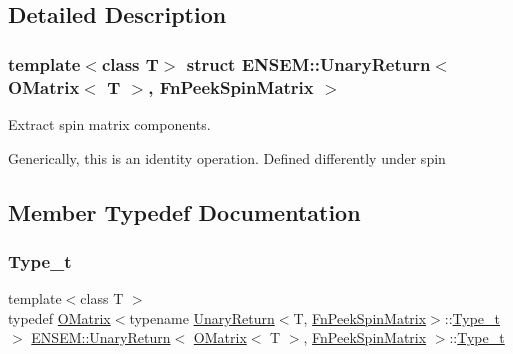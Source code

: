 \subsection{Detailed Description}
\subsubsection*{template$<$class T$>$\newline
struct E\+N\+S\+E\+M\+::\+Unary\+Return$<$ O\+Matrix$<$ T $>$, Fn\+Peek\+Spin\+Matrix $>$}

Extract spin matrix components. 

Generically, this is an identity operation. Defined differently under spin 

\subsection{Member Typedef Documentation}
\mbox{\label{structENSEM_1_1UnaryReturn_3_01OMatrix_3_01T_01_4_00_01FnPeekSpinMatrix_01_4_a9a23ee99cd498ef33180f667eae28655}} 
\subsubsection{\texorpdfstring{Type\_t}{Type\_t}\hspace{0.1cm}{\footnotesize\ttfamily [1/3]}}
{\footnotesize\ttfamily template$<$class T $>$ \\
typedef \mbox{\hyperlink{classENSEM_1_1OMatrix}{O\+Matrix}}$<$typename \mbox{\hyperlink{structENSEM_1_1UnaryReturn}{Unary\+Return}}$<$T, \mbox{\hyperlink{structENSEM_1_1FnPeekSpinMatrix}{Fn\+Peek\+Spin\+Matrix}}$>$\+::\mbox{\hyperlink{structENSEM_1_1UnaryReturn_3_01OMatrix_3_01T_01_4_00_01FnPeekSpinMatrix_01_4_a9a23ee99cd498ef33180f667eae28655}{Type\+\_\+t}}$>$ \mbox{\hyperlink{structENSEM_1_1UnaryReturn}{E\+N\+S\+E\+M\+::\+Unary\+Return}}$<$ \mbox{\hyperlink{classENSEM_1_1OMatrix}{O\+Matrix}}$<$ T $>$, \mbox{\hyperlink{structENSEM_1_1FnPeekSpinMatrix}{Fn\+Peek\+Spin\+Matrix}} $>$\+::\mbox{\hyperlink{structENSEM_1_1UnaryReturn_3_01OMatrix_3_01T_01_4_00_01FnPeekSpinMatrix_01_4_a9a23ee99cd498ef33180f667eae28655}{Type\+\_\+t}}}

